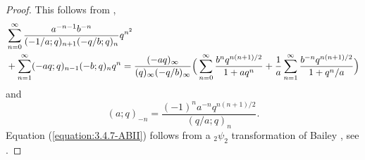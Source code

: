 \documentclass[12pt,reqno]{amsart}
\theoremstyle{remark}
\theoremstyle{definition}
\numberwithin{theorem}{section} \numberwithin{equation}{section}
\numberwithin{example}{section}
\begin{document}
\begin{proof} This follows from \cite[p. $15$]{RLN}, \cite[Entry $3.4.7$]{ABII}
\begin{align}
&\sum_{n=0}^{\infty}\frac{a^{-n-1}b^{-n}}{(-1/a;q)_{n+1}(-q/b;q)_n}q^{n^2}\label{equation:3.4.7-ABII}\\
&+\sum_{n=1}^{\infty}(-aq;q)_{n-1}(-b;q)_{n}q^{n}=\frac{(-aq)_{\infty}}{(q)_{\infty}(-q/b)_{\infty}}\Big ( \sum_{n=0}^{\infty}\frac{b^nq^{n(n+1)/2}}{1+aq^n}
+\frac{1}{a}\sum_{n=1}^{\infty}\frac{b^{-n}q^{n(n+1)/2}}{1+q^n/a}\Big )\notag
\end{align}
and
\begin{equation}
(a;q)_{-n}=\frac{(-1)^na^{-n}q^{n(n+1)/2}}{(q/a;q)_n}.\label{equation:minus-n}
\end{equation}
Equation (\ref{equation:3.4.7-ABII}) follows from a ${}_2\psi_2$ transformation of Bailey \cite{Ba}, see \cite[Entry $3.4.7$]{ABII}.
\end{proof}
\end{document}
